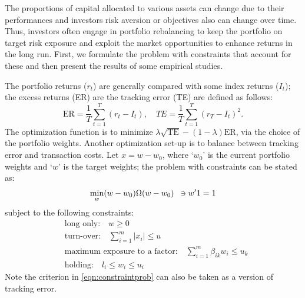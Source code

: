 The proportions of capital allocated to various assets can change due to their performances and investors risk aversion or objectives also can change over time. Thus, investors often engage in portfolio rebalancing to keep the portfolio on target risk exposure and exploit the market opportunities to enhance returns in the long run. First, we formulate the problem with constraints that account for these and then present the results of some empirical studies.


The portfolio returns ($r_t$) are generally compared with some index returns ($I_t$); the excess returns (ER) are the tracking error (TE) are defined as follows:
	\begin{equation} \label{eqn:excesstrack}
	\text{ER}= \dfrac{1}{T} \sum_{t=1}^T (r_t - I_t), \quad TE= \dfrac{1}{T} \sum_{t=1}^T (r_T - I_t)^2.
	\end{equation}
The optimization function is to minimize $\lambda \sqrt{\text{TE}} - (1 - \lambda) \text{ER}$, via the choice of the portfolio weights. Another optimization set-up is to balance between tracking error and transaction costs. Let $x= w - w_0$, where `$w_0$' is the current portfolio weights and `$w$' is the target weights; the problem with constraints can be stated as:
	\begin{equation} \label{eqn:constraintprob}
	\min_w (w - w_0) \Omega (w-w_0) \enskip \ni w'1= 1
	\end{equation}
subject to the following constraints:
	\begin{equation} \label{eqn:constraintlist}
	\begin{split}
	&\text{long only:} \quad w \geq 0 \\
	&\text{turn-over:} \quad \sum_{i=1}^m |x_i| \leq u \\
	&\text{maximum exposure to a factor:} \quad \sum_{i=1}^m \beta_{ik} w_i \leq u_k \\
	&\text{holding:} \quad l_i \leq w_i \leq u_i
	\end{split}
	\end{equation}
Note the criterion in \eqref{eqn:constraintprob} can also be taken as a version of tracking error. 


